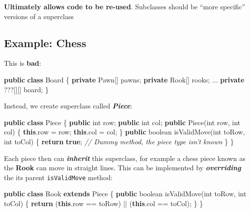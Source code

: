 \documentclass[]{article}
\newenvironment{Shaded}{}{}
\newcommand{\CommentTok}[1]{\textcolor[rgb]{0.38,0.63,0.69}{\textit{#1}}}
\newcommand{\DataTypeTok}[1]{\textcolor[rgb]{0.56,0.13,0.00}{#1}}
\newcommand{\FunctionTok}[1]{\textcolor[rgb]{0.02,0.16,0.49}{#1}}
\newcommand{\KeywordTok}[1]{\textcolor[rgb]{0.00,0.44,0.13}{\textbf{#1}}}
\newcommand{\NormalTok}[1]{#1}
\begin{document}
\textbf{Ultimately allows code to be re-used}. Subclasses should be
``more specific'' versions of a superclass

\hypertarget{example-chess}{%
\subsection{Example: Chess}\label{example-chess}}

This is \textbf{bad}:

\begin{Shaded}
\begin{Highlighting}[]
\KeywordTok{public} \KeywordTok{class}\NormalTok{ Board \{}
    \KeywordTok{private}\NormalTok{ Pawn[] pawns;}
    \KeywordTok{private}\NormalTok{ Rook[] rooks;}
\NormalTok{    ...}
    \KeywordTok{private}\NormalTok{ ???[][] board;}
\NormalTok{\}}
\end{Highlighting}
\end{Shaded}

Instead, we create superclass called \textbf{\emph{Piece}}:

\begin{Shaded}
\begin{Highlighting}[]
\KeywordTok{public} \KeywordTok{class}\NormalTok{ Piece \{}
    \KeywordTok{public} \DataTypeTok{int}\NormalTok{ row;}
    \KeywordTok{public} \DataTypeTok{int}\NormalTok{ col;}
    \KeywordTok{public} \FunctionTok{Piece}\NormalTok{(}\DataTypeTok{int}\NormalTok{ row, }\DataTypeTok{int}\NormalTok{ col) \{}
        \KeywordTok{this}\NormalTok{.}\FunctionTok{row}\NormalTok{ = row;}
        \KeywordTok{this}\NormalTok{.}\FunctionTok{col}\NormalTok{ = col;}
\NormalTok{    \}}
    \KeywordTok{public} \DataTypeTok{boolean} \FunctionTok{isValidMove}\NormalTok{(}\DataTypeTok{int}\NormalTok{ toRow, }\DataTypeTok{int}\NormalTok{ toCol) \{}
        \KeywordTok{return} \KeywordTok{true}\NormalTok{; }\CommentTok{// Dummy method, the piece type isn't known}
\NormalTok{    \}}
\NormalTok{\}}
\end{Highlighting}
\end{Shaded}

Each piece then can \textbf{\emph{inherit}} this superclass, for example
a chess piece known as the \textbf{Rook} can move in straight lines.
This can be implemented by \textbf{\emph{overriding}} the its parent
\texttt{isValidMove} method:

\begin{Shaded}
\begin{Highlighting}[]
\KeywordTok{public} \KeywordTok{class}\NormalTok{ Rook }\KeywordTok{extends}\NormalTok{ Piece \{}
    \KeywordTok{public} \DataTypeTok{boolean} \FunctionTok{isValidMove}\NormalTok{(}\DataTypeTok{int}\NormalTok{ toRow, }\DataTypeTok{int}\NormalTok{ toCol) \{}
        \KeywordTok{return}\NormalTok{ (}\KeywordTok{this}\NormalTok{.}\FunctionTok{row}\NormalTok{ == toRow) || (}\KeywordTok{this}\NormalTok{.}\FunctionTok{col}\NormalTok{ == toCol);}
\NormalTok{    \}}
\NormalTok{\}}
\end{Highlighting}
\end{Shaded}
\end{document}
